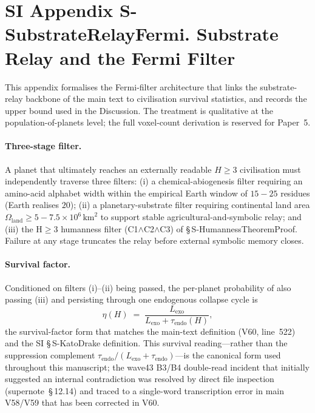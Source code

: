 \documentclass[11pt]{article}
\begin{document}
\section*{SI Appendix S-SubstrateRelayFermi. Substrate Relay and the Fermi Filter}
\label{sec:S-SubstrateRelayFermi}

This appendix formalises the Fermi-filter architecture that links the substrate-relay backbone of the main text to civilisation survival statistics, and records the upper bound used in the Discussion. The treatment is qualitative at the population-of-planets level; the full voxel-count derivation is reserved for Paper~5.

\paragraph{Three-stage filter.} A planet that ultimately reaches an externally readable $H{\geq}3$ civilisation must independently traverse three filters: (i) a chemical-abiogenesis filter requiring an amino-acid alphabet width within the empirical Earth window of $15{-}25$ residues (Earth realises $20$); (ii) a planetary-substrate filter requiring continental land area $\Omega_{\mathrm{land}}\geq 5{-}7.5\times 10^{6}\,\mathrm{km}^{2}$ to support stable agricultural-and-symbolic relay; and (iii) the H$\geq 3$ humanness filter (C1$\wedge$C2$\wedge$C3) of \S\,S-HumannessTheoremProof. Failure at any stage truncates the relay before external symbolic memory closes.

\paragraph{Survival factor.} Conditioned on filters (i)--(ii) being passed, the per-planet probability of also passing (iii) and persisting through one endogenous collapse cycle is
\begin{equation*}
  \eta(H) \;=\; \frac{L_{\mathrm{exo}}}{L_{\mathrm{exo}}+\tau_{\mathrm{endo}}(H)},
\end{equation*}
the survival-factor form that matches the main-text definition (V60, line~522) and the SI \S\,S-KatoDrake definition. This survival reading---rather than the suppression complement $\tau_{\mathrm{endo}}/(L_{\mathrm{exo}}{+}\tau_{\mathrm{endo}})$---is the canonical form used throughout this manuscript; the wave43 B3/B4 double-read incident that initially suggested an internal contradiction was resolved by direct file inspection (supernote~\S\,12.14) and traced to a single-word transcription error in main V58/V59 that has been corrected in V60.
\end{document}
